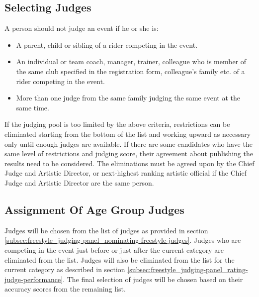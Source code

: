 \subsection{Selecting Judges \label{subsec:freestyle_judging-panel_selecting-judges}}
A person should not judge an event if he or she is:
\begin{itemize}
\item A parent, child or sibling of a rider competing in the event.
\item An individual or team coach, manager, trainer, colleague who is member of the same club specified in the registration form, colleague's family etc.
of a rider competing in the event.
\item More than one judge from the same family judging the same event at the same time.
\end{itemize}
If the judging pool is too limited by the above criteria, restrictions can be eliminated starting from the bottom of the list and working upward as necessary only until enough judges are available.
If there are some candidates who have the same level of restrictions and judging score, their agreement about publishing the results need to be considered.
The eliminations must be agreed upon by the Chief Judge and Artistic Director, or next-highest ranking artistic official if the Chief Judge and Artistic Director are the same person.

\subsection{Assignment Of Age Group Judges}
Judges will be chosen from the list of judges as provided in section \ref{subsec:freestyle_judging-panel_nominating-freestyle-judges}.
Judges who are competing in the event just before or just after the current category are eliminated from the list.
Judges will also be eliminated from the list for the current category as described in section \ref{subsec:freestyle_judging-panel_rating-judge-performance}.
The final selection of judges will be chosen based on their accuracy scores from the remaining list.

